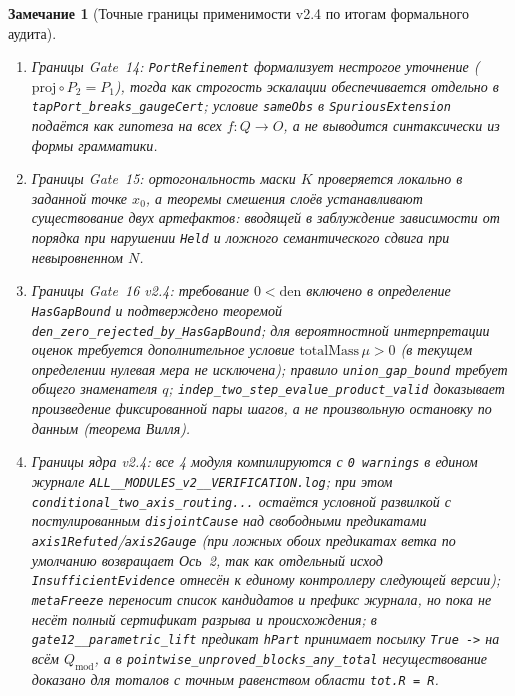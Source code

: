 \documentclass[11pt,a4paper]{article}
\theoremstyle{preprintthm}
\theoremstyle{preprintdef}
\newtheorem{remark}[theorem]{Замечание}
\begin{document}
\begin{remark}[Точные границы применимости v2.4 по итогам формального аудита]
\begin{enumerate}
  \item \emph{Границы Gate~14:} \texttt{PortRefinement} формализует нестрогое уточнение ($\mathrm{proj}\circ P_2 = P_1$), тогда как строгость эскалации обеспечивается отдельно в \texttt{tapPort\_\allowbreak breaks\_\allowbreak gaugeCert}; условие \texttt{sameObs} в \texttt{SpuriousExtension} подаётся как гипотеза на всех $f:Q\to O$, а не выводится синтаксически из формы грамматики.
  \item \emph{Границы Gate~15:} ортогональность маски $K$ проверяется локально в заданной точке $x_0$, а теоремы смешения слоёв устанавливают существование двух артефактов: вводящей в заблуждение зависимости от порядка при нарушении \texttt{Held} и ложного семантического сдвига при невыровненном $N$.
  \item \emph{Границы Gate~16 v2.4:} требование $0 < \mathrm{den}$ включено в определение \texttt{HasGapBound} и подтверждено теоремой \texttt{den\_\allowbreak zero\_\allowbreak rejected\_\allowbreak by\_\allowbreak HasGapBound}; для вероятностной интерпретации оценок требуется дополнительное условие $\mathrm{totalMass}\,\mu>0$ (в текущем определении нулевая мера не исключена); правило \texttt{union\_\allowbreak gap\_\allowbreak bound} требует общего знаменателя $q$; \texttt{indep\_\allowbreak two\_\allowbreak step\_\allowbreak evalue\_\allowbreak product\_\allowbreak valid} доказывает произведение фиксированной пары шагов, а не произвольную остановку по данным (теорема Вилля).
  \item \emph{Границы ядра v2.4:} все 4 модуля компилируются с \texttt{0~warnings} в едином журнале \texttt{ALL\_\_\allowbreak MODULES\_\allowbreak v2\_\_\allowbreak VERIFICATION.log}; при этом \texttt{conditional\_\allowbreak two\_\allowbreak axis\_\allowbreak routing...} остаётся условной развилкой с постулированным \texttt{disjointCause} над свободными предикатами \texttt{axis1Refuted}/\texttt{axis2Gauge} (при ложных обоих предикатах ветка по умолчанию возвращает Ось~2, так как отдельный исход \texttt{InsufficientEvidence} отнесён к единому контроллеру следующей версии); \texttt{metaFreeze} переносит список кандидатов и префикс журнала, но пока не несёт полный сертификат разрыва и происхождения; в \texttt{gate12\_\_\allowbreak parametric\_\allowbreak lift} предикат \texttt{hPart} принимает посылку \texttt{True ->} на всём $Q_{\mathrm{mod}}$, а в \texttt{pointwise\_\allowbreak unproved\_\allowbreak blocks\_\allowbreak any\_\allowbreak total} несуществование доказано для тоталов с точным равенством области \texttt{tot.R = R}.
\end{enumerate}
\end{remark}
\end{document}
